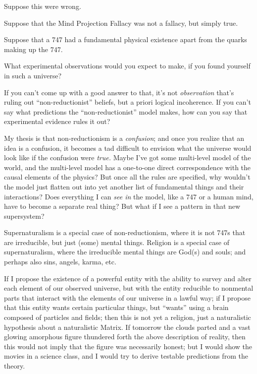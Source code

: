 {
 Suppose this were wrong.}

{
 Suppose that the Mind Projection Fallacy was not a fallacy, but
simply true.}

{
 Suppose that a 747 had a fundamental physical existence apart from
the quarks making up the 747.}

{
 What experimental observations would you expect to make, if you
found yourself in such a universe?}

{
 If you can't come up with a good answer to that,
it's not \textit{observation} that's
ruling out ``non-reductionist''
beliefs, but a priori logical incoherence. If you can't
say what predictions the
``non-reductionist'' model makes,
how can you say that experimental evidence rules it out?}

{
 My thesis is that non-reductionism is a \textit{confusion}; and
once you realize that an idea is a confusion, it becomes a tad
difficult to envision what the universe would look like if the
confusion were \textit{true.} Maybe I've got some
multi-level model of the world, and the multi-level model has a
one-to-one direct correspondence with the causal elements of the
physics? But once all the rules are specified, why
wouldn't the model just flatten out into yet another
list of fundamental things and their interactions? Does everything I
can \textit{see in} the model, like a 747 or a human mind, have to
become a separate real thing? But what if I see a pattern in that new
supersystem?}

{
 Supernaturalism is a special case of non-reductionism, where it is
not 747s that are irreducible, but just (some) mental things. Religion
is a special case of supernaturalism, where the irreducible mental
things are God(s) and souls; and perhaps also sins, angels, karma,
etc.}

{
 If I propose the existence of a powerful entity with the ability
to survey and alter each element of our observed universe, but with the
entity reducible to nonmental parts that interact with the elements of
our universe in a lawful way; if I propose that this entity wants
certain particular things, but
``wants'' using a brain composed of
particles and fields; then this is not yet a religion, just a
naturalistic hypothesis about a naturalistic Matrix. If tomorrow the
clouds parted and a vast glowing amorphous figure thundered forth the
above description of reality, then this would not imply that the figure
was necessarily honest; but I would show the movies in a science class,
and I would try to derive testable predictions from the theory.}

